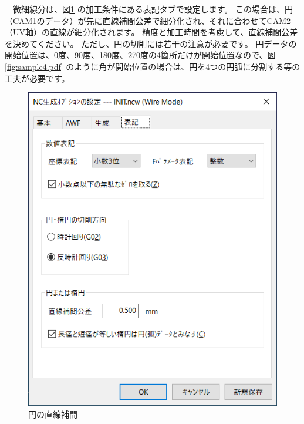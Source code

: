 　微細線分は、図\ref{fig:ncw2.png} の加工条件にある表記タブで設定します。
この場合は、円（CAM1のデータ）が先に直線補間公差で細分化され、それに合わせてCAM2（UV軸）の直線が細分化されます。
精度と加工時間を考慮して、直線補間公差を決めてください。
ただし、円の切削には若干の注意が必要です。
円データの開始位置は、0度、90度、180度、270度の4箇所だけが開始位置なので、図\ref{fig:sample4.pdf} のように角が開始位置の場合は、円を4つの円弧に分割する等の工夫が必要です。

\begin{minipage}{0.5\textwidth}
\begin{figure}[H]
\centering
\includegraphics[scale=0.7]{No2/fig/ncw2.png}
\caption{円の直線補間}
\label{fig:ncw2.png}
\end{figure}
\end{minipage}
